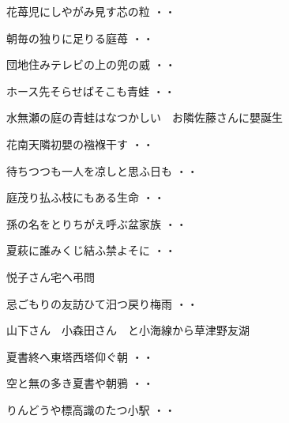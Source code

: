 \begin{shiika}花苺児にしやがみ見す芯の粒
\hfill{・・}\end{shiika}
\begin{shiika}朝毎の独りに足りる庭苺
\hfill{・・}\end{shiika}
\begin{shiika}団地住みテレビの上の兜の威
\hfill{・・}\end{shiika}
\begin{shiika}ホース先そらせばそこも青蛙
\hfill{・・}\end{shiika}
\vspace{0.6cm}
水無瀬の庭の青蛙はなつかしい　お隣佐藤さんに嬰誕生
\begin{shiika}花南天隣初嬰の襁褓干す
\hfill{・・}\end{shiika}
\begin{shiika}待ちつつも一人を凉しと思ふ日も
\hfill{・・}\end{shiika}
\begin{shiika}庭茂り払ふ枝にもある生命
\hfill{・・}\end{shiika}
\begin{shiika}孫の名をとりちがえ呼ぶ盆家族
\hfill{・・}\end{shiika}
\begin{shiika}夏萩に誰みくじ結ふ禁よそに
\hfill{・・}\end{shiika}
\vspace{0.6cm}
悦子さん宅へ弔問
\begin{shiika}忌ごもりの友訪ひて汨つ戻り梅雨
\hfill{・・}\end{shiika}
\vspace{0.6cm}
山下さん　小森田さん　と小海線から草津野友湖
\begin{shiika}夏書終へ東塔西塔仰ぐ朝
\hfill{・・}\end{shiika}
\begin{shiika}空と無の多き夏書や朝鴉
\hfill{・・}\end{shiika}
\begin{shiika}りんどうや標高識のたつ小駅
\hfill{・・}\end{shiika}
